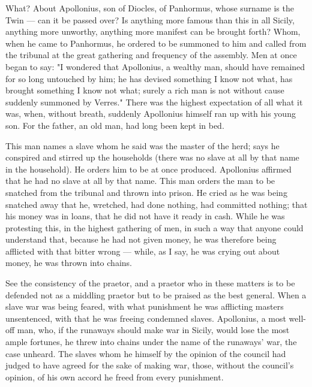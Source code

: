  What? About Apollonius, son of Diocles, of Panhormus, whose surname is the Twin --- can it be passed over? Is anything more famous than this in all Sicily, anything more unworthy, anything more manifest can be brought forth? Whom, when he came to Panhormus, he ordered to be summoned to him and called from the tribunal at the great gathering and frequency of the assembly. Men at once began to say: "I wondered that Apollonius, a wealthy man, should have remained for so long untouched by him; he has devised something I know not what, has brought something I know not what; surely a rich man is not without cause suddenly summoned by Verres." There was the highest expectation of all what it was, when, without breath, suddenly Apollonius himself ran up with his young son. For the father, an old man, had long been kept in bed.

 This man names a slave whom he said was the master of the herd; says he conspired and stirred up the households (there was no slave at all by that name in the household). He orders him to be at once produced. Apollonius affirmed that he had no slave at all by that name. This man orders the man to be snatched from the tribunal and thrown into prison. He cried as he was being snatched away that he, wretched, had done nothing, had committed nothing; that his money was in loans, that he did not have it ready in cash. While he was protesting this, in the highest gathering of men, in such a way that anyone could understand that, because he had not given money, he was therefore being afflicted with that bitter wrong --- while, as I say, he was crying out about money, he was thrown into chains.

 See the consistency of the praetor, and a praetor who in these matters is to be defended not as a middling praetor but to be praised as the best general. When a slave war was being feared, with what punishment he was afflicting masters unsentenced, with that he was freeing condemned slaves. Apollonius, a most well-off man, who, if the runaways should make war in Sicily, would lose the most ample fortunes, he threw into chains under the name of the runaways' war, the case unheard. The slaves whom he himself by the opinion of the council had judged to have agreed for the sake of making war, those, without the council's opinion, of his own accord he freed from every punishment.

